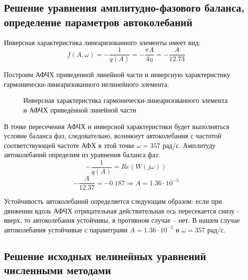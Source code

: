 \documentclass[main.tex]{subfiles}
\begin{document}
\subsection{Решение уравнения амплитудно-фазового баланса, определение параметров автоколебаний}
Инверсная характеристика линеаризованного элементы имеет вид:
 \[ f(A, \omega) = -\frac{1}{q(A)} = -\frac{\pi A}{4\eta} = -\frac{A}{12.73} \]

Построим АФЧХ приведенной линейной части и инверсную характеристику гармонически-линеаризованного 
нелинейного элемента.
\begin{figure}[h]
    \caption{Инверсная характеристика гармонически-линеаризованного элемента и АФЧХ приведённой линейной части}
\end{figure}

В точке пересечения АФЧХ и инверсной характеристики будет выполняться условие баланса фаз, 
следовательно, возникнут автоколебания с частотой соответствующей частоте 
АФХ в этой точке \( \omega = 357 \) рад/с. Амплитуду автоколебаний определим из уравнения 
баланса фаз:
 \[ -\frac{1}{q(A)} = Re(W(j\omega)) \]
\[ -\frac{A}{12.37} = -0.187 \Rightarrow A = 1.36 \cdot 10^{-5} \]

Устойчивость автоколебаний определяется следующим образом: если при движении вдоль 
АФЧХ отрицательная действительная ось пересекается снизу - вверх, то автоколебания 
устойчивы, в противном случае – нет. В нашем случае автоколебания устойчивые с 
параметрами \( A = 1.36 \cdot 10^{-5} \) и \( \omega = 357 \) рад/с.

\subsection{Решение исходных нелинейных уравнений численными методами}
\end{document}
